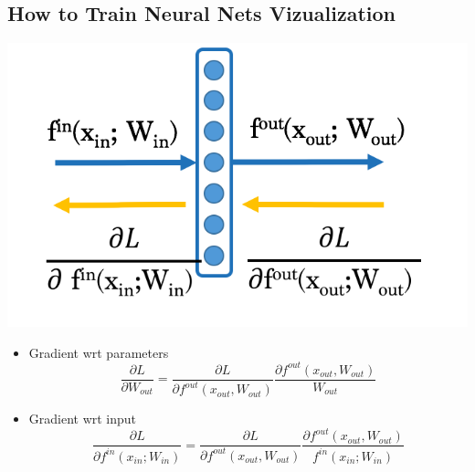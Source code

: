 \documentclass{beamer}
\begin{document}
	\subsection*{How to Train Neural Nets Vizualization}
	\begin{frame}
		\begin{center}
			\includegraphics[scale=0.3]{img/bp1}
			
			\begin{itemize}
				\item Gradient wrt parameters 
					$$\frac{\partial L}{\partial W_{out}} = 
						\frac{\partial L}{\partial f^{out}(x_{out}, W_{out})}
						\frac{\partial f^{out}(x_{out}, W_{out})}{W_{out}}  $$
				
				\item Gradient wrt input 
					$$\frac{\partial L}{\partial f^{in}(x_{in}; W_{in})} = 
						\frac{\partial L}{\partial f^{out}(x_{out}, W_{out})}
						\frac{\partial f^{out}(x_{out}, W_{out})}{f^{in}(x_{in}; W_{in})}  $$
			\end{itemize}
		\end{center}
	\end{frame}
	
\end{document}
